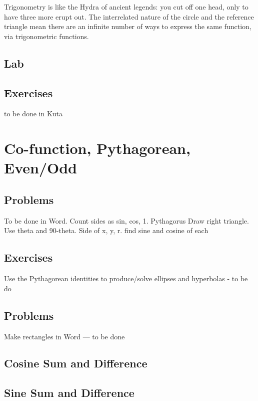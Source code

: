


Trigonometry is like the Hydra of ancient legends: you cut off one head, only to have
three more erupt out.  The interrelated nature of the circle and the reference triangle
mean there are an infinite number of ways to express the same function, via
trigonometric functions.


\newpage
\chapterminitoc


\newpage
{}
\subsection{Lab}
\noindent{}

\newpage
\subsection{Exercises}
to be done in Kuta


\newpage
\section{Co-function, Pythagorean, Even/Odd}
\subsection{Problems}
To be done in Word.
Count sides as sin, cos, 1.  Pythagorus
Draw right triangle.  Use theta and 90-theta.  Side of x, y, r.  find sine and cosine of each
\newpage

\newpage
\subsection{Exercises}
Use the Pythagorean identities to produce/solve ellipses and hyperbolas - to be do


\newpage
{}
\subsection{Problems}
Make rectangles in Word --- to be done
\subsection{Cosine Sum and Difference}
\subsection{Sine Sum and Difference}
